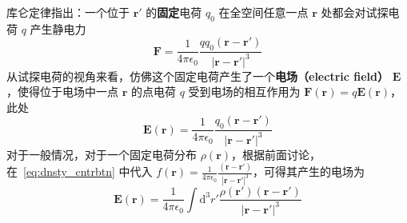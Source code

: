 \documentclass[cn,10pt,math=newtx,citestyle=gb7714-2015,bibstyle=gb7714-2015]{elegantbook}
\def\bm{\boldsymbol}
\def\d{\mathrm d}
\begin{document}
库仑定律指出：一个位于 $\bm r'$ 的\textbf{固定}电荷 $q_0$ 在全空间任意一点 $\bm r$ 处都会对试探电荷 $q$ 产生静电力
\begin{equation*}
    \bm F=\frac{1}{4\pi\epsilon_0}\frac{qq_0(\bm r-\bm r')}{|\bm r-\bm r'|^3}
\end{equation*}
从试探电荷的视角来看，仿佛这个固定电荷产生了一个\textbf{电场（electric field）} $\bm E$，使得位于电场中一点 $\bm r$ 的点电荷 $q$ 受到电场的相互作用为 $\bm F(\bm r)=q\bm E(\bm r)$，此处
\begin{equation*}
    \bm E(\bm r)=\frac{1}{4\pi\epsilon_0}\frac{q_0(\bm r-\bm r')}{|\bm r-\bm r'|^3}
\end{equation*}
对于一般情况，对于一个固定电荷分布 $\rho(\bm r)$，根据前面讨论，在~\ref{eq:dnsty_cntrbtn} 中代入 $f(\bm r) = \frac{1}{4\pi\epsilon_0}\frac{(\bm r-\bm r')}{|\bm r-\bm r'|^3}$，可得其产生的电场为
\begin{equation*}
    \bm E(\bm r)=\frac{1}{4\pi\epsilon_0}\int\d^3 r'\frac{\rho(\bm r')(\bm r-\bm r')}{|\bm r-\bm r'|^3}
\end{equation*}
\end{document}
